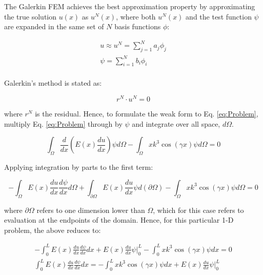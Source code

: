 \documentclass[10pt]{article}
\begin{document}
The Galerkin FEM achieves the best approximation property by approximating the true solution \(u(x)\) as \(u^N(x)\), where both \(u^N(x)\) and the test function \(\psi\) are expanded in the same set of \(N\) basis functions \(\phi\):

\begin{equation}
\label{eq:approx}
\begin{aligned}
u\approx u^N=\sum_{j=1}^{N}a_j\phi_j\\
\psi=\sum_{i=1}^{N}b_i\phi_i\\
\end{aligned}
\end{equation}

Galerkin's method is stated as:

\begin{equation}
r^N\cdot u^N=0
\end{equation}

where \(r^N\) is the residual. Hence, to formulate the weak form to Eq. \eqref{eq:Problem}, multiply Eq. \eqref{eq:Problem} through by \(\psi\) and integrate over all space, \(d\Omega\).

\begin{equation}
\int_{\Omega}^{}\frac{d}{dx}\left(E(x)\frac{du}{dx}\right)\psi d\Omega-\int_{\Omega}^{}xk^3\cos{(\gamma x)}\psi d\Omega=0
\end{equation}

Applying integration by parts to the first term:

\begin{equation}
-\int_{\Omega}^{}E(x)\frac{du}{dx}\frac{d\psi}{dx}d\Omega+\int_{\partial\Omega}^{}E(x)\frac{du}{dx}\psi d(\partial\Omega)-\int_{\Omega}^{}xk^3\cos{(\gamma x)}\psi d\Omega=0
\end{equation}

where \(\partial\Omega\) refers to one dimension lower than \(\Omega\), which for this case refers to evaluation at the endpoints of the domain. Hence, for this particular 1-D problem, the above reduces to:

\begin{equation}
\begin{aligned}
-\int_{0}^{L}E(x)\frac{du}{dx}\frac{d\psi}{dx}dx+ E(x)\frac{du}{dx}\psi\biggr\vert_{0}^{L}-\int_{0}^{L}xk^3\cos{(\gamma x)}\psi dx=0\\
\int_{0}^{L}E(x)\frac{du}{dx}\frac{d\psi}{dx}dx=-\int_{0}^{L}xk^3\cos{(\gamma x)}\psi dx+E(x)\frac{du}{dx}\psi\biggr\vert_{0}^{L}\\
\end{aligned}
\end{equation}
\end{document}
